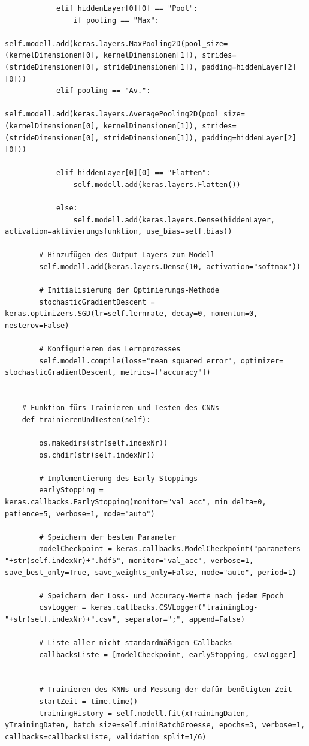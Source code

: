 \documentclass[a4paper,12pt,ngerman,oneside]{scrreprt}	%
\begin{document}
{\begin{lstlisting}
			elif hiddenLayer[0][0] == "Pool":
				if pooling == "Max":
					self.modell.add(keras.layers.MaxPooling2D(pool_size=(kernelDimensionen[0], kernelDimensionen[1]), strides=(strideDimensionen[0], strideDimensionen[1]), padding=hiddenLayer[2][0]))
			elif pooling == "Av.":
				self.modell.add(keras.layers.AveragePooling2D(pool_size=(kernelDimensionen[0], kernelDimensionen[1]), strides=(strideDimensionen[0], strideDimensionen[1]), padding=hiddenLayer[2][0]))
			
			elif hiddenLayer[0][0] == "Flatten":
				self.modell.add(keras.layers.Flatten())
			
			else:
				self.modell.add(keras.layers.Dense(hiddenLayer, activation=aktivierungsfunktion, use_bias=self.bias))
		
		# Hinzufügen des Output Layers zum Modell
		self.modell.add(keras.layers.Dense(10, activation="softmax"))
		
		# Initialisierung der Optimierungs-Methode
		stochasticGradientDescent = keras.optimizers.SGD(lr=self.lernrate, decay=0, momentum=0, nesterov=False)
		
		# Konfigurieren des Lernprozesses
		self.modell.compile(loss="mean_squared_error", optimizer= stochasticGradientDescent, metrics=["accuracy"])
	
	
	# Funktion fürs Trainieren und Testen des CNNs
	def trainierenUndTesten(self):
	
		os.makedirs(str(self.indexNr))
		os.chdir(str(self.indexNr))
		
		# Implementierung des Early Stoppings
		earlyStopping = keras.callbacks.EarlyStopping(monitor="val_acc", min_delta=0, patience=5, verbose=1, mode="auto")
		
		# Speichern der besten Parameter
		modelCheckpoint = keras.callbacks.ModelCheckpoint("parameters-"+str(self.indexNr)+".hdf5", monitor="val_acc", verbose=1, save_best_only=True, save_weights_only=False, mode="auto", period=1)
		
		# Speichern der Loss- und Accuracy-Werte nach jedem Epoch
		csvLogger = keras.callbacks.CSVLogger("trainingLog-"+str(self.indexNr)+".csv", separator=";", append=False)
		
		# Liste aller nicht standardmäßigen Callbacks
		callbacksListe = [modelCheckpoint, earlyStopping, csvLogger]
		
		
		# Trainieren des KNNs und Messung der dafür benötigten Zeit
		startZeit = time.time()
		trainingHistory = self.modell.fit(xTrainingDaten, yTrainingDaten, batch_size=self.miniBatchGroesse, epochs=3, verbose=1, callbacks=callbacksListe, validation_split=1/6)
		

\end{lstlisting}}
\end{document}
